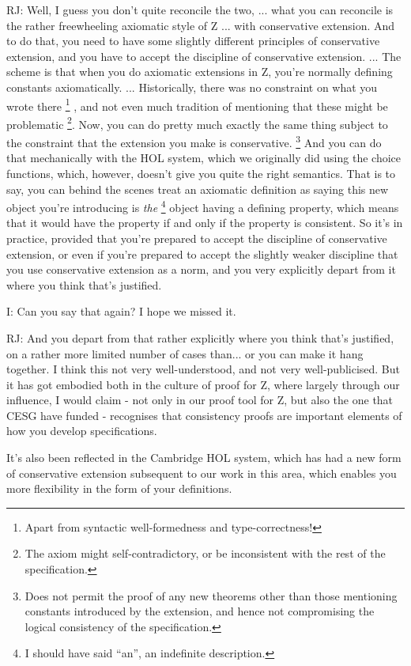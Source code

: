 \documentclass[10pt,titlepage]{book}
\begin{document}
RJ: Well, I guess you don't quite reconcile the two, ... what you can reconcile is the rather freewheeling axiomatic style of Z ... with conservative extension.
And to do that, you need to have some slightly different principles of conservative extension, and you have to accept the discipline of conservative extension.
...
The scheme is that when you do axiomatic extensions in Z, you're normally defining constants axiomatically.
...
Historically, there was no constraint on what you wrote there%
\footnote{
Apart from syntactic well-formedness and type-correctness!}%
, and not even much tradition of mentioning that these might be problematic%
\footnote{
The axiom might self-contradictory, or be inconsistent with the rest of the specification.
}.
Now, you can do pretty much exactly the same thing subject to the constraint that the extension you make is conservative.%
\footnote{
Does not permit the proof of any new theorems other than those mentioning constants introduced by the extension, and hence not compromising the logical consistency of the specification.}
And you can do that mechanically with the HOL system, which we originally did using the choice functions, which, however, doesn't give you quite the right semantics.
That is to say, you can behind the scenes treat an axiomatic definition as saying this new object you're introducing is {\it the}%
\footnote{I should have said ``an'', an indefinite description.}%
 object having a defining property, which means that it would have the property if and only if the property is consistent.
So it's in practice, provided that you're prepared to accept the discipline of conservative extension, or even if you're prepared to accept the slightly weaker discipline that you use conservative extension as a norm, and you very explicitly depart from it where you think that's justified.

I: Can you say that again?
I hope we missed it.

RJ: And you depart from that rather explicitly where you think that's justified, on a rather more limited number of cases than... or you can make it hang together.
I think this not very well-understood, and not very well-publicised.
But it has got embodied both in the culture of proof for Z, where largely through our influence, I would claim - not only in our proof tool for Z, but also the one that CESG have funded - recognises that consistency proofs are important elements of how you develop specifications.

It's also been reflected in the Cambridge HOL system, which has had a new form of conservative extension subsequent to our work in this area, which enables you more flexibility in the form of your definitions.
\end{document}
